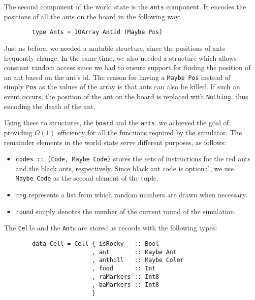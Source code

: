 \documentclass[a4paper,10pt]{article}
\begin{document}
The second component of the world state is the {\tt ants} component. It encodes
the positions of all the ants on the board in the following way:

\begin{verbatim}
        type Ants = IOArray AntId (Maybe Pos)
\end{verbatim}

Just as before, we needed a mutable structure, since the positions of ants frequently
change. In the same time, we also needed a structure which allows constant
random access since we had to ensure support for finding the position of an ant
based on the ant's id. The reason for having a {\tt Maybe Pos} instead of simply
{\tt Pos} as the values of the array is that ants can also be killed. If such an event
occurs, the position of the ant on the board is replaced with {\tt Nothing}, thus
encoding the death of the ant.

Using these to structures, the {\tt board} and the {\tt ants}, we achieved the goal
of providing $O(1)$ efficiency for all the functions required by the simulator. The
remainder elements in the world state serve different purposes, as follows:

\begin{itemize}

\item {\tt codes :: (Code, Maybe Code)} stores the sets of instructions for the red ants
and the black ants, respectively. Since black ant code is optional, we use {\tt Maybe Code}
as the second element of the tuple.

\item {\tt rng} represents a list from which random numbers are drawn when
necessary.

\item{\tt round} simply denotes the number of the current round of the simulation.

\end{itemize}

The {\tt Cell}s and the {\tt Ant}s are stored as records with the following types:

\begin{verbatim}
        data Cell = Cell { isRocky   :: Bool
                         , ant       :: Maybe Ant
                         , anthill   :: Maybe Color
                         , food      :: Int
                         , raMarkers :: Int8
                         , baMarkers :: Int8
                         }
\end{verbatim}
\end{document}
